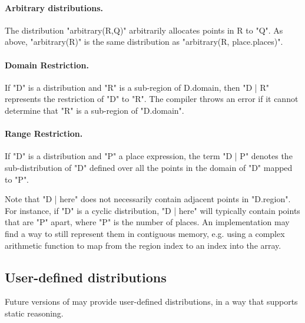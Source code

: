 \paragraph{Arbitrary distributions.} 
The distribution \xcd"arbitrary(R,Q)" arbitrarily allocates points in {\cf
R} to \xcd"Q". As above, \xcd"arbitrary(R)" is the same distribution as
\xcd"arbitrary(R, place.places)".


\paragraph{Domain Restriction.} 

If \xcd"D" is a distribution and \xcd"R" is a sub-region of {\cf
D.domain}, then \xcd"D | R" represents the restriction of \xcd"D" to
\xcd"R".  The compiler throws an error if it cannot determine that
\xcd"R" is a sub-region of \xcd"D.domain".

\paragraph{Range Restriction.}

If \xcd"D" is a distribution and \xcd"P" a place expression, the term
\xcd"D | P" denotes the sub-distribution of \xcd"D" defined over all the
points in the domain of \xcd"D" mapped to \xcd"P".

Note that \xcd"D | here" does not necessarily contain adjacent points
in \xcd"D.region". For instance, if \xcd"D" is a cyclic distribution,
\xcd"D | here" will typically contain points that are \xcd"P" apart,
where \xcd"P" is the number of places. An implementation may find a
way to still represent them in contiguous memory, e.g.{} using a
complex arithmetic function to map from the region index to an index
into the array.

\subsection{User-defined distributions}

Future versions of \Xten{} may provide user-defined distributions, in
a way that supports static reasoning.


